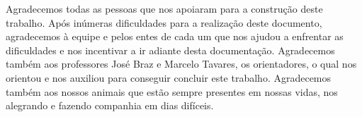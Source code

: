 \begin{agradecimentos}
Agradecemos todas as pessoas que nos apoiaram para a construção deste trabalho. Após inúmeras dificuldades para a realização deste documento, agradecemos à equipe e pelos entes de cada um que nos ajudou a enfrentar as dificuldades e nos incentivar a ir adiante desta documentação. 
Agradecemos também aos professores José Braz e Marcelo Tavares, os orientadores, o qual nos orientou e nos auxiliou para conseguir concluir este trabalho.
Agradecemos também aos nossos animais que estão sempre presentes em nossas vidas, nos alegrando e fazendo companhia em dias difíceis. 

\end{agradecimentos}
